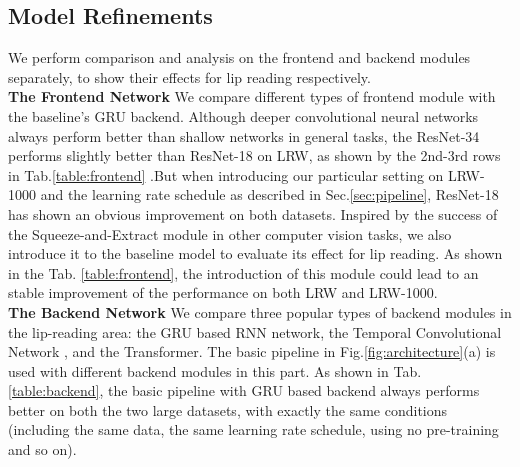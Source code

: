 \documentclass{article}
\begin{document}
\subsection{Model Refinements}
We perform comparison and analysis on the frontend and backend modules separately, to show their effects for lip reading respectively. 
\vspace{0.5em}
\\
\indent\textbf{The Frontend Network} We compare different types of frontend module with the baseline's GRU backend. Although deeper convolutional neural networks always perform better than shallow networks in general tasks, the ResNet-34 performs slightly better than ResNet-18 on LRW, as shown by the 2nd-3rd rows in Tab.\ref{table:frontend} .But when introducing our particular setting on LRW-1000 and the learning rate schedule as described in Sec.\ref{sec:pipeline}, ResNet-18 has shown an obvious improvement on both datasets. Inspired by the success of the Squeeze-and-Extract module \cite{hu2018squeeze} in other computer vision tasks, we also introduce it to the baseline model to evaluate its effect for lip reading. As shown in the Tab. \ref{table:frontend}, the introduction of this module could lead to an stable improvement of the performance on both LRW and LRW-1000.
\vspace{0.5em}
\\
\indent\textbf{The Backend Network} We compare three popular types of backend modules in the lip-reading area: the GRU based RNN network, the Temporal Convolutional Network \cite{martinez2020lipreading}, and the Transformer. The basic pipeline in Fig.\ref{fig:architecture}(a) is used with different backend modules in this part. As shown in Tab. \ref{table:backend}, the basic pipeline with GRU based backend always performs better on both the two large datasets, with exactly the same conditions (including the same data, the same learning rate schedule, using no pre-training and so on).
\end{document}
